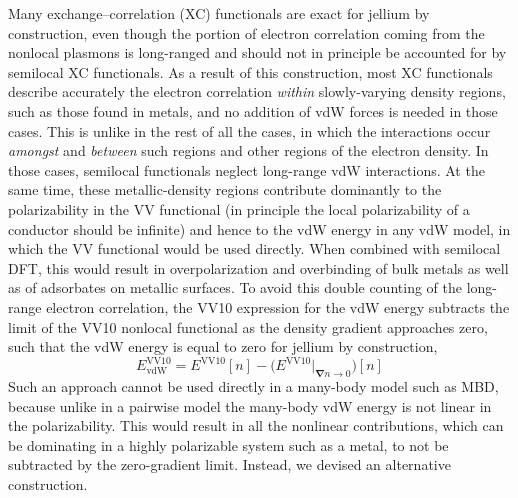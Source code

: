 Many exchange--correlation (XC) functionals are exact for jellium by construction, even though the portion of electron correlation coming from the nonlocal plasmons is long-ranged and should not in principle be accounted for by semilocal XC functionals.
As a result of this construction, most XC functionals describe accurately the electron correlation \emph{within} slowly-varying density regions, such as those found in metals, and no addition of vdW forces is needed in those cases.
This is unlike in the rest of all the cases, in which the interactions occur \emph{amongst} and \emph{between} such regions and other regions of the electron density.
In those cases, semilocal functionals neglect long-range vdW interactions.
At the same time, these metallic-density regions contribute dominantly to the polarizability in the VV functional (in principle the local polarizability of a conductor should be infinite) and hence to the vdW energy in any vdW model, in which the VV functional would be used directly.
When combined with semilocal DFT, this would result in overpolarization and overbinding of bulk metals as well as of adsorbates on metallic surfaces.
To avoid this double counting of the long-range electron correlation, the VV10 expression for the vdW energy subtracts the limit of the VV10 nonlocal functional as the density gradient approaches zero, such that the vdW energy is equal to zero for jellium by construction,
\begin{equation}
  E_\text{vdW}^\text{VV10}
    =E^\text{VV10}[n]-\bigl(E^\text{VV10}|_{\boldsymbol\nabla n\rightarrow0}\bigr)[n]
\end{equation}
Such an approach cannot be used directly in a many-body model such as MBD, because unlike in a pairwise model the many-body vdW energy is not linear in the polarizability.
This would result in all the nonlinear contributions, which can be dominating in a highly polarizable system such as a metal, to not be subtracted by the zero-gradient limit.
Instead, we devised an alternative construction.

